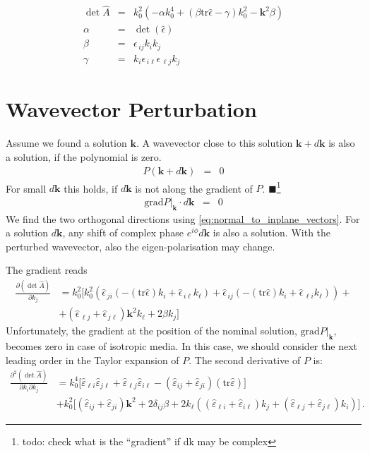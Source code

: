 \documentclass[12pt,a4paper,twoside,openright,BCOR10mm,headsepline,titlepage,abstracton,chapterprefix,final]{scrreprt}
\newcommand\Vector[1]{{\mathbf{#1}}}
\newcommand\wavenumber{k}
\newcommand\Wavevector{\Vector{\wavenumber}}
\newcommand\Tensor[1]{\hat{#1}}
\newcommand\permittivity{\Tensor{\scalarpermittivity}}
\newcommand\scalarrelativepermittivity{\epsilon}
\newcommand\relativepermittivity{\Tensor{\scalarrelativepermittivity}}
\newcommand\scalarpermittivity{\varepsilon}
\newcommand\tr{\text{tr}}
\newcommand{\remark}[1]{{\color{red}$\blacksquare$}\footnote{{\color{red}#1}}}
\begin{document}
\begin{eqnarray}
 \det \hat{A}  &=& k_0^2 \left( -\alpha k_0^4 +  (\beta \text{tr}\relativepermittivity - \gamma) k_0^2 - \Vector{k}^2 \beta \right) \\
 \alpha &=& \det(\relativepermittivity) \\
 \beta &=& \scalarrelativepermittivity_{\,ij} k_i k_j \\
 \gamma &=& k_i \scalarrelativepermittivity_{\,i\ell} \scalarrelativepermittivity_{\,\ell j} k_j
\end{eqnarray}

\section{Wavevector Perturbation}

Assume we found a solution $\Wavevector$. 
A wavevector close to this solution $\Wavevector + d\Wavevector$ is also a solution, if the polynomial is zero.
\begin{eqnarray}
 P(\Wavevector+ d\Wavevector) &=& 0
\end{eqnarray}
For small $d\Wavevector$ this holds, if $d\Wavevector$ is not along the gradient of $P$.
\remark{todo: check what is the ``gradient'' if dk may be complex}
\begin{eqnarray}
 \left. \textrm{grad} P \right|_\Wavevector \cdot d\Wavevector &=& 0 \label{eq:wavevectorPerturbationObeyingDispersion}
\end{eqnarray}
We find the two orthogonal directions using \eqref{eq:normal_to_inplane_vectors}.
For a solution $d\Wavevector$, any shift of complex phase $e^{i\phi} d\Wavevector$ is also a solution.
With the perturbed wavevector, also the eigen-polarisation may change.

The gradient reads
\begin{align}
 \frac{\partial (\det \hat{A})}{\partial k_j} &= k_0^2 
\big[
k_0^2
\left(
  \relativepermittivity_{\,ji} (-(\tr\relativepermittivity) k_i + \relativepermittivity_{\,i\ell} k_\ell)
+ \relativepermittivity_{\,ij} (-(\tr\relativepermittivity) k_i + \relativepermittivity_{\,\ell i} k_\ell)
\right) +
\nonumber \\
&+ (\relativepermittivity_{\,\ell j} + \relativepermittivity_{\,j \ell}) \Vector{k}^2 k_\ell + 2 \beta k_j
\big]
\end{align}
Unfortunately, the gradient at the position of the nominal solution, $\textrm{grad} P |_\Wavevector$,
becomes zero in case of isotropic media.
In this case, we should consider the next leading order in the Taylor expansion of $P$.
The second derivative of $P$ is:
\begin{align}
 \frac{\partial^2 (\det \hat{A})}{\partial k_i \partial k_j} &= 
k_0^4 \biggl[
  \permittivity_{\ell i} \permittivity_{j \ell} 
+ \permittivity_{\ell j} \permittivity_{i \ell}
- (\permittivity_{ij} + \permittivity_{ji}) (\tr\permittivity)
\biggr] \nonumber\\ 
&+ k_0^2 \biggl[
  (\permittivity_{ij} + \permittivity_{ji})\Wavevector^2
+ 2 \delta_{ij} \beta
+ 2 k_\ell ((\permittivity_{\ell i}  + \permittivity_{i \ell}) k_j + (\permittivity_{\ell j} + \permittivity_{j \ell}) k_i)
\biggr]\,.
\end{align}
\end{document}
